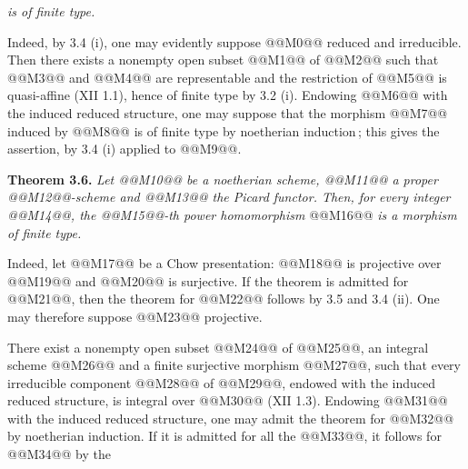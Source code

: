 \emph{is of finite type.}

Indeed, by 3.4 (i), one may evidently suppose @@M0@@ reduced and irreducible. Then there exists a nonempty open subset @@M1@@ of @@M2@@ such that @@M3@@ and @@M4@@ are representable and the restriction of @@M5@@ is quasi-affine (XII 1.1), hence of finite type by 3.2 (i). Endowing @@M6@@ with the induced reduced structure, one may suppose that the morphism @@M7@@ induced by @@M8@@ is of finite type by noetherian induction\,; this gives the assertion, by 3.4 (i) applied to @@M9@@.

\textbf{Theorem 3.6.} \emph{Let @@M10@@ be a noetherian scheme, @@M11@@ a proper @@M12@@-scheme and @@M13@@ the Picard functor. Then, for every integer @@M14@@, the @@M15@@-th power homomorphism}
@@M16@@
\emph{is a morphism of finite type.}

Indeed, let @@M17@@ be a Chow presentation: @@M18@@ is projective over @@M19@@ and @@M20@@ is surjective. If the theorem is admitted for @@M21@@, then the theorem for @@M22@@ follows by 3.5 and 3.4 (ii). One may therefore suppose @@M23@@ projective.

There exist a nonempty open subset @@M24@@ of @@M25@@, an integral scheme @@M26@@ and a finite surjective morphism @@M27@@, such that every irreducible component @@M28@@ of @@M29@@, endowed with the induced reduced structure, is integral over @@M30@@ (XII 1.3). Endowing @@M31@@ with the induced reduced structure, one may admit the theorem for @@M32@@ by noetherian induction. If it is admitted for all the @@M33@@, it follows for @@M34@@ by the

